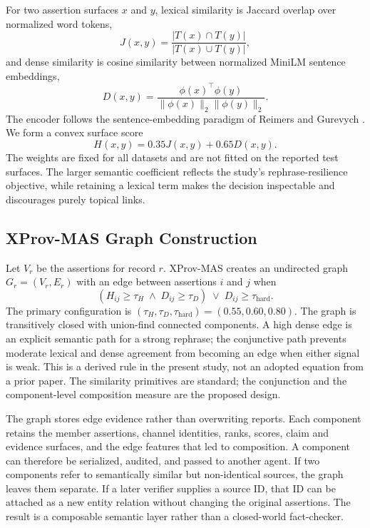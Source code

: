 \documentclass{ieeeaccess}
\begin{document}
For two assertion surfaces $x$ and $y$, lexical similarity is Jaccard overlap over normalized word tokens,
\begin{equation}
 J(x,y)=\frac{|T(x)\cap T(y)|}{|T(x)\cup T(y)|},
 \label{eq:jaccard}
\end{equation}
and dense similarity is cosine similarity between normalized MiniLM sentence embeddings,
\begin{equation}
 D(x,y)=\frac{\phi(x)^{\top}\phi(y)}{\|\phi(x)\|_2\|\phi(y)\|_2}.
 \label{eq:dense}
\end{equation}
The encoder follows the sentence-embedding paradigm of Reimers and Gurevych \cite{reimers2020sentence}. We form a convex surface score
\begin{equation}
 H(x,y)=0.35J(x,y)+0.65D(x,y).
 \label{eq:hybrid}
\end{equation}
The weights are fixed for all datasets and are not fitted on the reported test surfaces. The larger semantic coefficient reflects the study's rephrase-resilience objective, while retaining a lexical term makes the decision inspectable and discourages purely topical links.

\subsection{XProv-MAS Graph Construction}
Let $V_r$ be the assertions for record $r$. XProv-MAS creates an undirected graph $G_r=(V_r,E_r)$ with an edge between assertions $i$ and $j$ when
\begin{equation}
 (H_{ij}\geq\tau_H\;\wedge\;D_{ij}\geq\tau_D)\;\vee\;D_{ij}\geq\tau_{\mathrm{hard}}.
 \label{eq:edge}
\end{equation}
The primary configuration is $(\tau_H,\tau_D,\tau_{\mathrm{hard}})=(0.55,0.60,0.80)$. The graph is transitively closed with union-find connected components. A high dense edge is an explicit semantic path for a strong rephrase; the conjunctive path prevents moderate lexical and dense agreement from becoming an edge when either signal is weak. This is a derived rule in the present study, not an adopted equation from a prior paper. The similarity primitives are standard; the conjunction and the component-level composition measure are the proposed design.

The graph stores edge evidence rather than overwriting reports. Each component retains the member assertions, channel identities, ranks, scores, claim and evidence surfaces, and the edge features that led to composition. A component can therefore be serialized, audited, and passed to another agent. If two components refer to semantically similar but non-identical sources, the graph leaves them separate. If a later verifier supplies a source ID, that ID can be attached as a new entity relation without changing the original assertions. The result is a composable semantic layer rather than a closed-world fact-checker.
\end{document}
